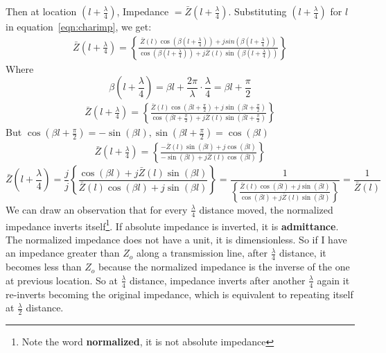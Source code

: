 Then at location ${(l+\frac{\lambda}{4})}$, Impedance  $=\bar{Z}(l+\frac{\lambda}{4})$. Substituting ${(l+\frac{\lambda}{4})}$ for $l$ in equation~\ref{eqn:charimp}, we get:
\begin{align*}
\bar{Z}\left(l+\frac{\lambda}{4}\right) = \left\lbrace \frac{\bar{Z}(l)\cos(\beta (l+\frac{\lambda}{4})) + jsin(\beta (l+\frac{\lambda}{4}))}{\cos(\beta (l+\frac{\lambda}{4})) + j\bar{Z}(l)\sin(\beta (l+\frac{\lambda}{4}))}\right\rbrace 
\end{align*}
Where 
\begin{dmath*}
\beta(l + \frac{\lambda}{4})=\beta l + \frac{2\pi}{\lambda} \cdot \frac{\lambda}{4} = \beta l + \frac{\pi}{2}
\end{dmath*}
\begin{align*} 
\bar{Z}\left(l+\frac{\lambda}{4}\right) = \left\lbrace \frac{\bar{Z}(l)\cos(\beta l + \frac{\pi}{2}) + j\sin(\beta l + \frac{\pi}{2})}{\cos(\beta l + \frac{\pi}{2}) + j\bar{Z}(l)\sin(\beta l + \frac{\pi}{2})}\right\rbrace
\end{align*}
But $\cos(\beta l + \frac{\pi}{2})= -\sin(\beta l), \sin(\beta l+\frac{\pi}{2})=\cos(\beta l)$
\begin{align*} 
\bar{Z}\left(l+\frac{\lambda}{4}\right) = \left\lbrace \frac{-\bar{Z}(l)\sin(\beta l) + j\cos(\beta l)}{-\sin(\beta l) + j\bar{Z}(l) \cos(\beta l)}\right\rbrace
\end{align*}
\begin{dmath*}
\bar{Z}\left(l+\frac{\lambda}{4}\right) =\frac{j}{j} \left\lbrace \frac{\cos(\beta l) + j\bar{Z}(l)\sin(\beta l)}{\bar{Z}(l)\cos(\beta l) + j\sin(\beta l)}\right\rbrace 
= \frac{1}{\left\lbrace \frac{\bar{Z}(l)\cos(\beta l) + j\sin(\beta l)}{\cos(\beta l) + j\bar{Z}(l)\sin(\beta l)}\right\rbrace} 
=\frac{1}{\bar{Z}(l)}
\end{dmath*}
We can draw an observation that for every $\frac{\lambda}{4}$ distance moved, the normalized impedance inverts itself\footnote{Note the word \textbf{normalized}, it is not absolute impedance}. If absolute impedance is inverted, it is \textbf{admittance}. The normalized impedance does not have a unit, it is dimensionless. So if I have an impedance greater than $Z_o$ along a transmission line, after $\frac{\lambda}{4}$ distance, it becomes less than $Z_o$ because the normalized impedance is the inverse of the one at previous location. So at $\frac{\lambda}{4}$ distance, impedance inverts after another $\frac{\lambda}{4}$ again it re-inverts becoming the original impedance, which is equivalent to repeating itself at $\frac{\lambda}{2}$ distance. 

